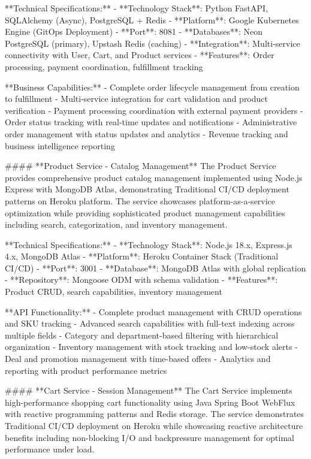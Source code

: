 **Technical Specifications:**
- **Technology Stack**: Python FastAPI, SQLAlchemy (Async), PostgreSQL + Redis
- **Platform**: Google Kubernetes Engine (GitOps Deployment)
- **Port**: 8081
- **Databases**: Neon PostgreSQL (primary), Upstash Redis (caching)
- **Integration**: Multi-service connectivity with User, Cart, and Product services
- **Features**: Order processing, payment coordination, fulfillment tracking

**Business Capabilities:**
- Complete order lifecycle management from creation to fulfillment
- Multi-service integration for cart validation and product verification
- Payment processing coordination with external payment providers
- Order status tracking with real-time updates and notifications
- Administrative order management with status updates and analytics
- Revenue tracking and business intelligence reporting

#### **Product Service - Catalog Management**
The Product Service provides comprehensive product catalog management implemented using Node.js Express with MongoDB Atlas, demonstrating Traditional CI/CD deployment patterns on Heroku platform. The service showcases platform-as-a-service optimization while providing sophisticated product management capabilities including search, categorization, and inventory management.

**Technical Specifications:**
- **Technology Stack**: Node.js 18.x, Express.js 4.x, MongoDB Atlas
- **Platform**: Heroku Container Stack (Traditional CI/CD)
- **Port**: 3001
- **Database**: MongoDB Atlas with global replication
- **Repository**: Mongoose ODM with schema validation
- **Features**: Product CRUD, search capabilities, inventory management

**API Functionality:**
- Complete product management with CRUD operations and SKU tracking
- Advanced search capabilities with full-text indexing across multiple fields
- Category and department-based filtering with hierarchical organization
- Inventory management with stock tracking and low-stock alerts
- Deal and promotion management with time-based offers
- Analytics and reporting with product performance metrics

#### **Cart Service - Session Management**
The Cart Service implements high-performance shopping cart functionality using Java Spring Boot WebFlux with reactive programming patterns and Redis storage. The service demonstrates Traditional CI/CD deployment on Heroku while showcasing reactive architecture benefits including non-blocking I/O and backpressure management for optimal performance under load.

